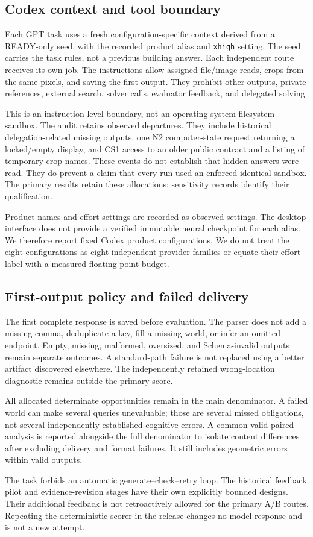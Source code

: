 \subsection{Codex context and tool boundary}
Each GPT task uses a fresh configuration-specific context derived from a READY-only seed, with the recorded product alias and \texttt{xhigh} setting. The seed carries the task rules, not a previous building answer. Each independent route receives its own job. The instructions allow assigned file/image reads, crops from the same pixels, and saving the first output. They prohibit other outputs, private references, external search, solver calls, evaluator feedback, and delegated solving.

This is an instruction-level boundary, not an operating-system filesystem sandbox. The audit retains observed departures. They include historical delegation-related missing outputs, one N2 computer-state request returning a locked/empty display, and CS1 access to an older public contract and a listing of temporary crop names. These events do not establish that hidden answers were read. They do prevent a claim that every run used an enforced identical sandbox. The primary results retain these allocations; sensitivity records identify their qualification.

Product names and effort settings are recorded as observed settings. The desktop interface does not provide a verified immutable neural checkpoint for each alias. We therefore report fixed Codex product configurations. We do not treat the eight configurations as eight independent provider families or equate their effort label with a measured floating-point budget.

\subsection{First-output policy and failed delivery}
The first complete response is saved before evaluation. The parser does not add a missing comma, deduplicate a key, fill a missing world, or infer an omitted endpoint. Empty, missing, malformed, oversized, and Schema-invalid outputs remain separate outcomes. A standard-path failure is not replaced using a better artifact discovered elsewhere. The independently retained wrong-location diagnostic remains outside the primary score.

All allocated determinate opportunities remain in the main denominator. A failed world can make several queries unevaluable; those are several missed obligations, not several independently established cognitive errors. A common-valid paired analysis is reported alongside the full denominator to isolate content differences after excluding delivery and format failures. It still includes geometric errors within valid outputs.

The task forbids an automatic generate--check--retry loop. The historical feedback pilot and evidence-revision stages have their own explicitly bounded designs. Their additional feedback is not retroactively allowed for the primary A/B routes. Repeating the deterministic scorer in the release changes no model response and is not a new attempt.
